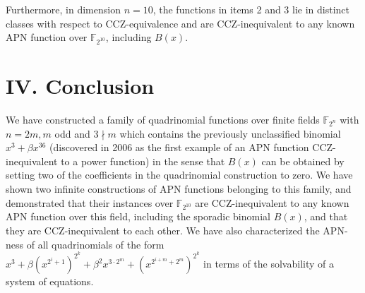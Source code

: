 \documentclass[10pt]{article}
\begin{document}
Furthermore, in dimension $n=10$, the functions in items 2 and 3 lie in distinct classes with respect to CCZ-equivalence and are CCZ-inequivalent to any known APN function over $\mathbb{F}_{2^{10}}$, including $B(x)$.

\section*{IV. Conclusion}
We have constructed a family of quadrinomial functions over finite fields $\mathbb{F}_{2^{n}}$ with $n=2 m, m$ odd and $3 \nmid m$ which contains the previously unclassified binomial $x^{3}+\beta x^{36}$ (discovered in 2006 as the first example of an APN function CCZ-inequivalent to a power function) in the sense that $B(x)$ can be obtained by setting two of the coefficients in the quadrinomial construction to zero. We have shown two infinite constructions of APN functions belonging to this family, and demonstrated that their instances over $\mathbb{F}_{2^{10}}$ are CCZ-inequivalent to any known APN function over this field, including the sporadic binomial $B(x)$, and that they are CCZ-inequivalent to each other. We have also characterized the APN-ness of all quadrinomials of the form $x^{3}+\beta\left(x^{2^{i}+1}\right)^{2^{k}}+ \beta^{2} x^{3 \cdot 2^{m}}+\left(x^{2^{i+m}+2^{m}}\right)^{2^{k}}$ in terms of the solvability of a system of equations.
\end{document}
